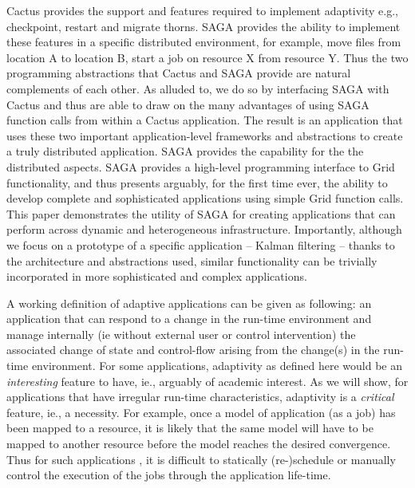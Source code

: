 \documentclass[conference,final]{IEEEtran}
\begin{document}
Cactus provides the support and features required to implement
adaptivity e.g., checkpoint, restart and migrate thorns. SAGA provides
the ability to implement these features in a specific distributed
environment, for example, move files from location A to location B,
start a job on resource X from resource Y.  Thus the two programming
abstractions that Cactus and SAGA provide are natural complements of
each other.  As alluded to, we do so by interfacing SAGA with Cactus
and thus are able to draw on the many advantages of using SAGA
function calls from within a Cactus application.  The result is an
application that uses these two important application-level frameworks
and abstractions to create a truly distributed application.  SAGA
provides the capability for the the distributed aspects. SAGA provides
a high-level programming interface to Grid functionality, and thus
presents arguably, for the first time ever, the ability to develop
complete and sophisticated applications using simple Grid function
calls.  This paper demonstrates the utility of SAGA for creating
applications that can perform across dynamic and heterogeneous
infrastructure.  Importantly, although we focus on a prototype of a
specific application -- Kalman filtering -- thanks to the architecture
and abstractions used, similar functionality can be trivially
incorporated in more sophisticated and complex applications.

A working definition of adaptive applications can be given as
following: an application that can respond to a change in the run-time
environment and manage internally (ie without external user or control
intervention) the associated change of state and control-flow arising
from the change(s) in the run-time environment.  For some
applications, adaptivity as defined here would be an {\it interesting}
feature to have, ie., arguably of academic interest. As we will show,
for applications that have irregular run-time characteristics,
adaptivity is a {\it critical} feature, ie., a necessity.  For
example, once a model of application (as a job) has been mapped to a
resource, it is likely that the same model will have to be mapped to
another resource before the model reaches the desired convergence.
Thus for such applications , it is difficult to statically
(re-)schedule or manually control the execution of the jobs through
the application life-time.
\end{document}
